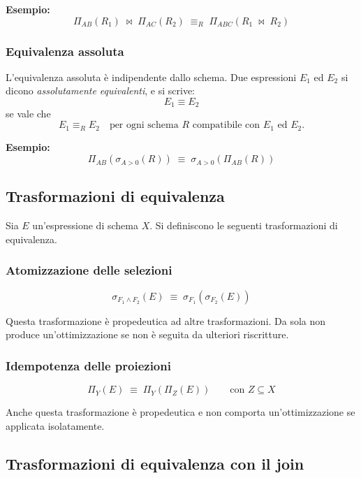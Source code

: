 \medskip

\noindent
\textbf{Esempio:}
\[
\Pi_{AB}(R_1) \;\bowtie\; \Pi_{AC}(R_2)
\;\equiv_R\;
\Pi_{ABC}(R_1 \;\bowtie\; R_2)
\]

\subsubsection{Equivalenza assoluta}

L’equivalenza assoluta è indipendente dallo schema.
Due espressioni $E_1$ ed $E_2$ si dicono \emph{assolutamente equivalenti}, e si scrive:
\[
E_1 \equiv E_2
\]
se vale che
\[
E_1 \equiv_R E_2 \quad \text{per ogni schema } R \text{ compatibile con } E_1 \text{ ed } E_2.
\]

\medskip

\noindent
\textbf{Esempio:}
\[
\Pi_{AB}(\sigma_{A>0}(R)) \;\equiv\; \sigma_{A>0}(\Pi_{AB}(R))
\]


\subsection{Trasformazioni di equivalenza}

Sia $E$ un’espressione di schema $X$. Si definiscono le seguenti trasformazioni
di equivalenza.

\subsubsection*{Atomizzazione delle selezioni}

\[
\sigma_{F_1 \land F_2}(E) \;\equiv\; \sigma_{F_1}(\sigma_{F_2}(E))
\]

Questa trasformazione è propedeutica ad altre trasformazioni.
Da sola non produce un’ottimizzazione se non è seguita da ulteriori riscritture.

\subsubsection{Idempotenza delle proiezioni}

\[
\Pi_Y(E) \;\equiv\; \Pi_Y(\Pi_Z(E)) \qquad \text{con } Z \subseteq X
\]

Anche questa trasformazione è propedeutica e non comporta
un’ottimizzazione se applicata isolatamente.


\subsection{Trasformazioni di equivalenza con il join}

